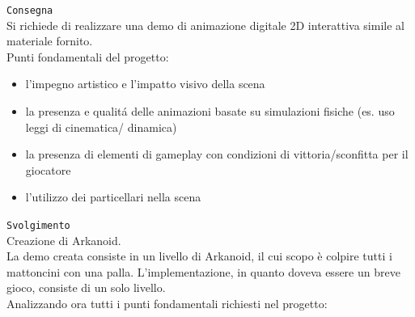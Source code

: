 \texttt{Consegna}\\
Si richiede di realizzare una demo di animazione digitale 2D interattiva simile al materiale fornito.\\
Punti fondamentali del progetto:
\begin{itemize}
    \item l’impegno artistico e l’impatto visivo della scena
    \item la presenza e qualitá delle animazioni basate su simulazioni fisiche (es. uso leggi di cinematica/
dinamica)
    \item la presenza di elementi di gameplay con condizioni di vittoria/sconfitta per il giocatore
    \item l’utilizzo dei particellari nella scena
\end{itemize}
\texttt{Svolgimento}\\
Creazione di Arkanoid.\\
La demo creata consiste in un livello di Arkanoid, il cui scopo è colpire tutti i mattoncini con una palla. L'implementazione, in quanto doveva essere un breve gioco, consiste di un solo livello. \\
Analizzando ora tutti i punti fondamentali richiesti nel progetto:
